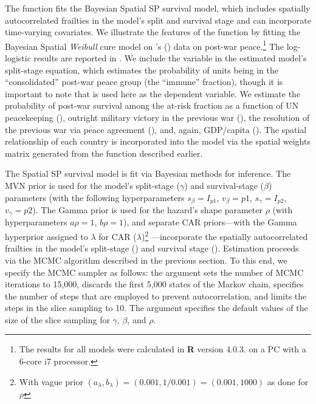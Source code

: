 The  function fits the Bayesian Spatial SP survival model, which includes spatially autocorrelated frailties in the model’s split and survival stage and can incorporate time-varying covariates. We illustrate the features of the  function by fitting the Bayesian Spatial \emph{Weibull} cure model on \citeauthor{walter2015bad}'s (\citeyear{walter2015bad}) data on post-war peace.\footnote{The results for all models were calculated in \textbf{R} version 4.0.3. on a PC with a 6-core i7 processor.} The log-logistic results are reported in \citet{Bolte2021}. We include the  variable in the estimated model’s split-stage equation, which estimates the probability of units being in the “consolidated” post-war peace group (the “immune” fraction), though it is important to note that   is used here as the dependent variable. We estimate the probability of post-war survival among the at-risk fraction as a function of UN peacekeeping (), outright military victory in the previous war (), the resolution of the previous war via peace agreement (), and, again, GDP/capita (). The spatial relationship of each country is incorporated into the model via the spatial weights matrix generated from the  function described earlier.

The Spatial SP survival model is fit via Bayesian methods for inference. The MVN prior is used for the model’s split-stage ($\gamma$) and survival-stage ($\beta$) parameters (with the following hyperparameters $s_\beta = I_{p1}$, $v_\beta=p1$, $s_\gamma = I_{p2}$, $v_\gamma=p2$). The Gamma prior is used for the hazard’s shape parameter $\rho$ (with hyperparameters $a\rho=1$, $b\rho=1$), and separate CAR priors---with the Gamma hyperprior assigned to $\lambda$ for CAR ($\lambda$)\footnote{With vague prior $\left(a_{\lambda},b_{\lambda}\right)=\left(0.001,1/0.001\right)=\left(0.001,1000\right)$ as done for $\rho$}  ---incorporate the spatially autocorrelated frailties in the model’s split-stage () and survival stage (). Estimation proceeds via the MCMC algorithm described in the previous section. To this end, we specify the MCMC sampler as follows: the argument  sets the number of MCMC iterations to 15,000,  discards the first 5,000 states of the Markov chain,  specifies the number of steps that are employed to prevent autocorrelation, and  limits the steps in the slice sampling to 10. The argument  specifies the default values of the size of the slice sampling for $\gamma$, $\beta$, and $\rho$. 


